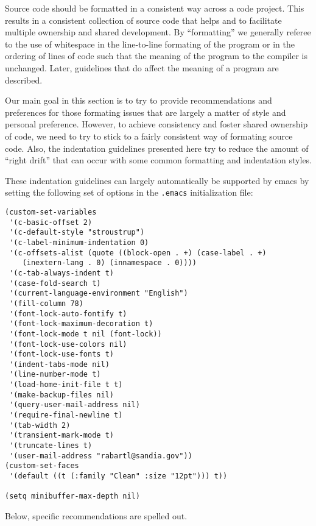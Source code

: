 Source code should be formatted in a consistent way across a code project.
This results in a consistent collection of source code that helps and to
facilitate multiple ownership and shared development.  By ``formatting'' we
generally referee to the use of whitespace in the line-to-line formating of
the program or in the ordering of lines of code such that the meaning of the
program to the compiler is unchanged.  Later, guidelines that do affect the
meaning of a program are described.

Our main goal in this section is to try to provide recommendations and
preferences for those formating issues that are largely a matter of style and
personal preference.  However, to achieve consistency and foster shared
ownership of code, we need to try to stick to a fairly consistent way of
formating source code.  Also, the indentation guidelines presented here try to
reduce the amount of ``right drift'' that can occur with some common
formatting and indentation styles.

These indentation guidelines can largely automatically be supported by emacs
by setting the following set of options in the {}\texttt{.emacs}
initialization file:

{\small\begin{verbatim}
(custom-set-variables
 '(c-basic-offset 2)
 '(c-default-style "stroustrup")
 '(c-label-minimum-indentation 0)
 '(c-offsets-alist (quote ((block-open . +) (case-label . +)
    (inextern-lang . 0) (innamespace . 0))))
 '(c-tab-always-indent t)
 '(case-fold-search t)
 '(current-language-environment "English")
 '(fill-column 78)
 '(font-lock-auto-fontify t)
 '(font-lock-maximum-decoration t)
 '(font-lock-mode t nil (font-lock))
 '(font-lock-use-colors nil)
 '(font-lock-use-fonts t)
 '(indent-tabs-mode nil)
 '(line-number-mode t)
 '(load-home-init-file t t)
 '(make-backup-files nil)
 '(query-user-mail-address nil)
 '(require-final-newline t)
 '(tab-width 2)
 '(transient-mark-mode t)
 '(truncate-lines t)
 '(user-mail-address "rabartl@sandia.gov"))
(custom-set-faces
 '(default ((t (:family "Clean" :size "12pt"))) t))

(setq minibuffer-max-depth nil)
\end{verbatim}}

Below, specific recommendations are spelled out.

